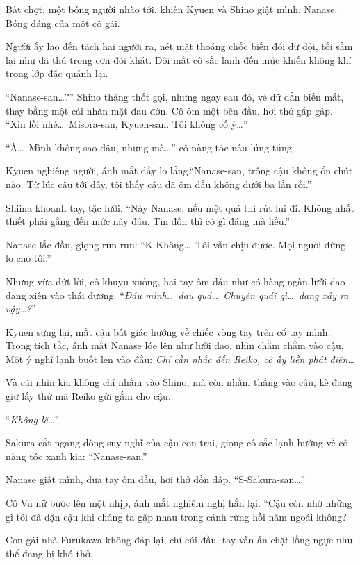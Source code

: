\documentclass[../main.tex]{subfiles}
\begin{document}
Bất chợt, một bóng người nhào tới, khiến Kyuen và Shino giật mình. Nanase. Bóng dáng của một cô gái.

Người ấy lao đến tách hai người ra, nét mặt thoáng chốc biến đổi dữ dội, tối sầm lại như dã thú trong cơn đói khát. Đôi mắt cô sắc lạnh đến mức khiến không khí trong lớp đặc quánh lại.


``Nanase-san\dots?'' Shino thảng thốt gọi, nhưng ngay sau đó, vẻ dữ dằn biến mất, thay bằng một cái nhăn mặt đau đớn. Cô ôm một bên đầu, hơi thở gấp gáp. ``Xin lỗi nhé\dots\ Misora-san, Kyuen-san. Tôi không cố ý\dots''

``À\dots\ Mình không sao đâu, nhưng mà\dots'' cô nàng tóc nâu lúng túng.

Kyuen nghiêng người, ánh mắt đầy lo lắng.``Nanase-san, trông cậu không ổn chút nào. Từ lúc cậu tới đây, tôi thấy cậu đã ôm đầu không dưới ba lần rồi.''

Shiina khoanh tay, tặc lưỡi. ``Này Nanase, nếu mệt quá thì rút lui đi. Không nhất thiết phải gắng đến mức này đâu. Tin đồn thì có gì đáng mà liều.''

Nanase lắc đầu, giọng run run: ``K-Không\dots\ Tôi vẫn chịu được. Mọi người đừng lo cho tôi.''

Nhưng vừa dứt lời, cô khuỵu xuống, hai tay ôm đầu như có hàng ngàn lưỡi dao đang xiên vào thái dương. ``\textit{Đầu mình\dots\ đau quá\dots\ Chuyện quái gì\dots\ đang xảy ra vậy\dots?}''

Kyuen sững lại, mắt cậu bất giác hướng về chiếc vòng tay trên cổ tay mình. Trong tích tắc, ánh mắt Nanase lóe lên như lưỡi dao, nhìn chằm chằm vào cậu. Một ý nghĩ lạnh buốt len vào đầu: \textit{Chỉ cần nhắc đến Reiko, cô ấy liền phát điên\dots}

Và cái nhìn kia không chỉ nhắm vào Shino, mà còn nhắm thẳng vào cậu, kẻ đang giữ lấy thứ mà Reiko gửi gắm cho cậu.

``\textit{Không lẽ\dots}''

Sakura cắt ngang dòng suy nghĩ của cậu con trai, giọng cô sắc lạnh hướng về cô nàng tóc xanh kia: ``Nanase-san.''

Nanase giật mình, đưa tay ôm đầu, hơi thở dồn dập. ``S-Sakura-san\dots''

Cô Vu nữ bước lên một nhịp, ánh mắt nghiêm nghị hẳn lại. ``Cậu còn nhớ những gì tôi đã dặn cậu khi chúng ta gặp nhau trong cánh rừng hồi năm ngoái không?

Con gái nhà Furukawa không đáp lại, chỉ cúi đầu, tay vẫn ấn chặt lồng ngực như thể đang bị khó thở.
\end{document}

